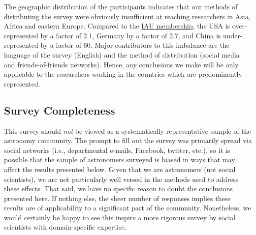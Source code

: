 The geographic distribution of the participants indicates that our methods of distributing the survey were obviously insufficient at reaching researchers in Asia, Africa and eastern Europe. Compared to the \href{http://www.iau.org/administration/membership/individual/distribution/}{IAU membership}, the USA is over-represented by a factor of 2.1, Germany by a factor of 2.7, and China is under-represented by a factor of 60. Major contributors to this imbalance are the language of the survey (English) and the method of distribution (social media and friends-of-friends networks). Hence, any conclusions we make will be only applicable to the researchers working in the countries which are predominantly represented.

\subsection{Survey Completeness}

This survey should \emph{not} be viewed as a systematically representative sample of the astronomy community.  
The prompt to fill out the survey was primarily spread via social networks (i.e., departmental e-mails, Facebook, twitter, etc.), so it is possible that the sample of astronomers surveyed is biased in ways that may affect the results presented below.
Given that we are astronomers (not social scientists), we are not particularly well versed in the methods used to address these effects.
That said, we have no specific reason to doubt the conclusions presented here.  If nothing else, the sheer number of responses implies these results are of applicability to a significant part of the community.
Nonetheless, we would certainly be happy to see this inspire a more rigorous survey by social scientists with domain-specific expertise.
